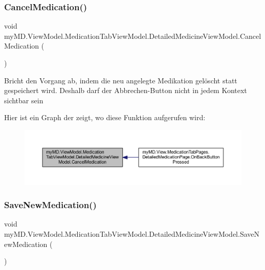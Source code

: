\subsubsection{\texorpdfstring{Cancel\+Medication()}{CancelMedication()}}
{\footnotesize\ttfamily void my\+M\+D.\+View\+Model.\+Medication\+Tab\+View\+Model.\+Detailed\+Medicine\+View\+Model.\+Cancel\+Medication (\begin{DoxyParamCaption}{ }\end{DoxyParamCaption})}



Bricht den Vorgang ab, indem die neu angelegte Medikation gelöscht statt gespeichert wird. Deshalb darf der Abbrechen-\/\+Button nicht in jedem Kontext sichtbar sein 

Hier ist ein Graph der zeigt, wo diese Funktion aufgerufen wird\+:
\nopagebreak
\begin{figure}[H]
\begin{center}
\leavevmode
\includegraphics[width=350pt]{classmy_m_d_1_1_view_model_1_1_medication_tab_view_model_1_1_detailed_medicine_view_model_a481a7dd27905ec3a70ca7e5bb0c4f5d4_icgraph}
\end{center}
\end{figure}
\mbox{\label{classmy_m_d_1_1_view_model_1_1_medication_tab_view_model_1_1_detailed_medicine_view_model_ae30844bb875a0f1c59a450e9fd4ecebd}} 
\subsubsection{\texorpdfstring{Save\+New\+Medication()}{SaveNewMedication()}}
{\footnotesize\ttfamily void my\+M\+D.\+View\+Model.\+Medication\+Tab\+View\+Model.\+Detailed\+Medicine\+View\+Model.\+Save\+New\+Medication (\begin{DoxyParamCaption}{ }\end{DoxyParamCaption})}




